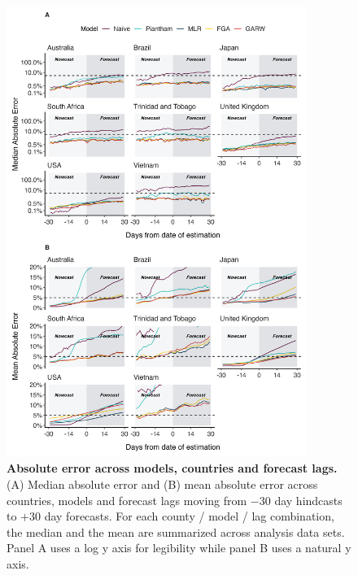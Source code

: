 \documentclass[11pt,oneside,letterpaper]{article}
\begin{document}
\begin{figure}[tb!]
	\centering
	\includegraphics[width=0.87\textwidth]{figures/model_comp_A.png}
	\caption{\textbf{Absolute error across models, countries and forecast lags.}
	(A) Median absolute error and (B) mean absolute error across countries, models and forecast lags moving from $-30$ day hindcasts to $+30$ day forecasts.
	For each county / model / lag combination, the median and the mean are summarized across analysis data sets.
	Panel A uses a log y axis for legibility while panel B uses a natural y axis.
	}
	\label{fig:model_comp_A}
\end{figure}
\end{document}
